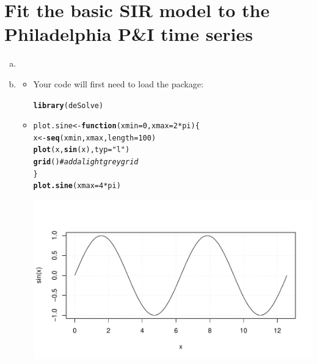 \documentclass[12pt]{article}\usepackage[]{graphicx}\usepackage[]{color}
\makeatletter
\def\maxwidth{ %
  \ifdim\Gin@nat@width>\linewidth
    \linewidth
  \else
    \Gin@nat@width
  \fi
}
\newcommand{\hlnum}[1]{\textcolor[rgb]{0.686,0.059,0.569}{#1}}%
\newcommand{\hlstr}[1]{\textcolor[rgb]{0.192,0.494,0.8}{#1}}%
\newcommand{\hlcom}[1]{\textcolor[rgb]{0.678,0.584,0.686}{\textit{#1}}}%
\newcommand{\hlopt}[1]{\textcolor[rgb]{0,0,0}{#1}}%
\newcommand{\hlstd}[1]{\textcolor[rgb]{0.345,0.345,0.345}{#1}}%
\newcommand{\hlkwa}[1]{\textcolor[rgb]{0.161,0.373,0.58}{\textbf{#1}}}%
\newcommand{\hlkwb}[1]{\textcolor[rgb]{0.69,0.353,0.396}{#1}}%
\newcommand{\hlkwc}[1]{\textcolor[rgb]{0.333,0.667,0.333}{#1}}%
\newcommand{\hlkwd}[1]{\textcolor[rgb]{0.737,0.353,0.396}{\textbf{#1}}}%
\newenvironment{kframe}{%
 \def\at@end@of@kframe{}%
 \ifinner\ifhmode%
  \def\at@end@of@kframe{\end{minipage}}%
  \begin{minipage}{\columnwidth}%
 \fi\fi%
 \def\FrameCommand##1{\hskip\@totalleftmargin \hskip-\fboxsep
 \colorbox{shadecolor}{##1}\hskip-\fboxsep
     \hskip-\linewidth \hskip-\@totalleftmargin \hskip\columnwidth}%
 \MakeFramed {\advance\hsize-\width
   \@totalleftmargin\z@ \linewidth\hsize
   \@setminipage}}%
 {\par\unskip\endMakeFramed%
 \at@end@of@kframe}
\newenvironment{knitrout}{}{} %
\makeatother
\begin{document}
\section{Fit the basic SIR model to the Philadelphia P\&I time series}

\begin{enumerate}[(a)]

\item \FitSIRa

\item \FitSIRbIntro
\begin{itemize}
    \item Your code will first need to load the  package:
\begin{knitrout}
\color{fgcolor}\begin{kframe}
\begin{alltt}
\hlkwd{library}\hlstd{(deSolve)}
\end{alltt}
\end{kframe}
\end{knitrout}
    \item \FitSIRbii
\begin{knitrout}
\color{fgcolor}\begin{kframe}
\begin{alltt}
\hlstd{plot.sine} \hlkwb{<-} \hlkwa{function}\hlstd{(} \hlkwc{xmin}\hlstd{=}\hlnum{0}\hlstd{,} \hlkwc{xmax}\hlstd{=}\hlnum{2}\hlopt{*}\hlstd{pi ) \{}
  \hlstd{x} \hlkwb{<-} \hlkwd{seq}\hlstd{(xmin,xmax,}\hlkwc{length}\hlstd{=}\hlnum{100}\hlstd{)}
  \hlkwd{plot}\hlstd{(x,} \hlkwd{sin}\hlstd{(x),} \hlkwc{typ}\hlstd{=}\hlstr{"l"}\hlstd{)}
  \hlkwd{grid}\hlstd{()} \hlcom{# add a light grey grid}
\hlstd{\}}
\hlkwd{plot.sine}\hlstd{(}\hlkwc{xmax}\hlstd{=}\hlnum{4}\hlopt{*}\hlstd{pi)}
\end{alltt}
\end{kframe}
\includegraphics[width=\maxwidth]{figure/plot_sine-1} 


\end{knitrout}
\end{itemize}
\end{enumerate}
\end{document}
